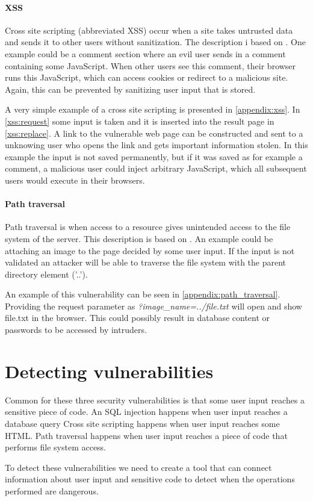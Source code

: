 \paragraph{XSS}
Cross site scripting (abbreviated XSS) occur when a site takes untrusted data and sends it to other users without sanitization.
The description i based on \citet{crosssitescripting}.
One example could be a comment section where an evil user sends in a comment containing some JavaScript.
When other users see this comment, their browser runs this JavaScript, which can access cookies or redirect to a malicious site.
Again, this can be prevented by sanitizing user input that is stored.

A very simple example of a cross site scripting is presented in \cref{appendix:xss}.
In \cref{xss:request} some input is taken and it is inserted into the result page in \cref{xss:replace}.
A link to the vulnerable web page can be constructed and sent to a unknowing user who opens the link and gets important information stolen.
In this example the input is not saved permanently, but if it was saved as for example a comment, a malicious user could inject arbitrary JavaScript, which all subsequent users would execute in their browsers.

\paragraph{Path traversal}
Path traversal is when access to a resource gives unintended access to the file system of the server.
This description is based on \citet{pathtraversal}.
An example could be attaching an image to the page decided by some user input.
If the input is not validated an attacker will be able to traverse the file system with the parent directory element ('..'). 

An example of this vulnerability can be seen in \cref{appendix:path_traversal}.
Providing the request parameter as \emph{?image\_name=../file.txt} will open and show file.txt in the browser.
This could possibly result in database content or passwords to be accessed by intruders.



\section{Detecting vulnerabilities}\label{vulnerabilities:detecting}
Common for these three security vulnerabilities is that some user input reaches a sensitive piece of code.
An SQL injection happens when user input reaches a database query
Cross site scripting happens when user input reaches some HTML.
Path traversal happens when user input reaches a piece of code that performs file system access.

To detect these vulnerabilities we need to create a tool that can connect information about user input and sensitive code to detect when the operations performed are dangerous.
